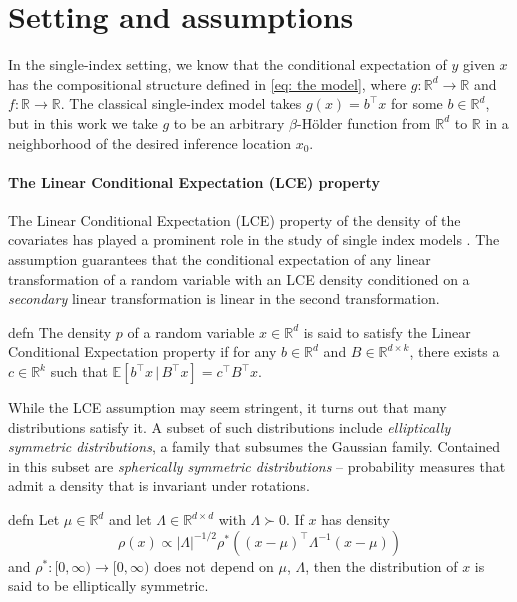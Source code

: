 \documentclass[11pt]{article}
\begin{document}
\section{Setting and assumptions}

In the single-index setting, we know that the conditional expectation of $y$ given $x$ has the  compositional structure defined in \cref{eq: the model}, where $g:\mathbb{R}^d \rightarrow \mathbb{R}$ and $f: \mathbb{R}\rightarrow\mathbb{R}$. The classical single-index model takes $g(x) = b^{\top}x$ for some $b \in \mathbb{R}^d$, but in this work we take $g$ to be an arbitrary $\beta$-H\"older function from $\mathbb{R}^d$ to $\mathbb{R}$ in a neighborhood of the desired inference location $x_0$. 


\paragraph{The Linear Conditional Expectation (LCE) property}
The Linear Conditional Expectation (LCE) property of the density of the covariates has played a prominent role in the study of single index models \cite{li1989regression, li1991sliced}. The assumption guarantees that the conditional expectation of any linear transformation of a random variable with an LCE density conditioned on a \textit{secondary} linear transformation is linear in the second transformation. 

\begin{restatable}{defn}{} \label{def: lce}
    The density $p$ of a random variable $x\in \mathbb{R}^d$ is said to satisfy the Linear Conditional Expectation property if for any $b \in \mathbb{R}^{d}$ and $B \in \mathbb{R}^{d\times k}$, there exists a $c\in \mathbb{R}^k$ such that $\mathbb{E}[b^{\top}x \,| \,B^{\top}x ] = c^{\top}B^{\top}x.$
\end{restatable}

While the LCE assumption may seem stringent, it turns out that many distributions satisfy it. A subset of such distributions include \textit{elliptically symmetric distributions}, a family that subsumes the Gaussian family. Contained in this subset are \textit{spherically symmetric distributions} -- probability measures that admit a density that is invariant under rotations.

\begin{restatable}{defn}{}\label{def: elliptical symmetry}
Let $\mu \in \mathbb{R}^d$ and let $\Lambda \in \mathbb{R}^{d\times d}$ with $\Lambda \succ 0$. If $x$ has density
\begin{equation}
     \rho(x) \propto |\Lambda|^{-1/2}\rho^*\left((x-\mu)^{\top}\Lambda^{-1}(x - \mu)\right)
\end{equation}
and $\rho^*:[0, \infty) \rightarrow[0, \infty)$ does not depend on $\mu$, $\Lambda$, then the distribution of $x$ is said to be elliptically symmetric. 
\end{restatable}
\end{document}
